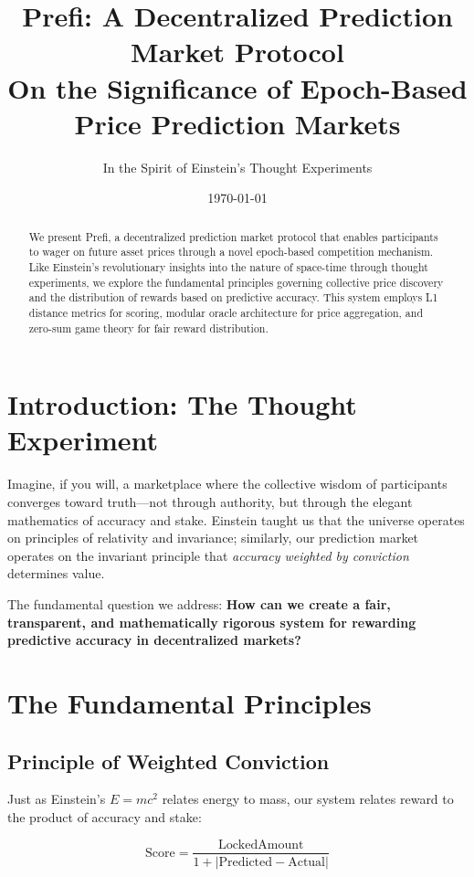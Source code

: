 \documentclass[12pt,a4paper]{article}
\title{\textbf{Prefi: A Decentralized Prediction Market Protocol}\\\large{On the Significance of Epoch-Based Price Prediction Markets}}
\author{In the Spirit of Einstein's Thought Experiments}
\date{\today}
\begin{document}
\maketitle

\begin{abstract}
We present Prefi, a decentralized prediction market protocol that enables participants to wager on future asset prices through a novel epoch-based competition mechanism. Like Einstein's revolutionary insights into the nature of space-time through thought experiments, we explore the fundamental principles governing collective price discovery and the distribution of rewards based on predictive accuracy. This system employs L1 distance metrics for scoring, modular oracle architecture for price aggregation, and zero-sum game theory for fair reward distribution.
\end{abstract}

\section{Introduction: The Thought Experiment}

Imagine, if you will, a marketplace where the collective wisdom of participants converges toward truth—not through authority, but through the elegant mathematics of accuracy and stake. Einstein taught us that the universe operates on principles of relativity and invariance; similarly, our prediction market operates on the invariant principle that \textit{accuracy weighted by conviction} determines value.

The fundamental question we address: \textbf{How can we create a fair, transparent, and mathematically rigorous system for rewarding predictive accuracy in decentralized markets?}

\section{The Fundamental Principles}

\subsection{Principle of Weighted Conviction}
Just as Einstein's $E=mc^2$ relates energy to mass, our system relates reward to the product of accuracy and stake:

\begin{equation}
\text{Score} = \frac{\text{LockedAmount}}{1 + |\text{Predicted} - \text{Actual}|}
\end{equation}
\end{document}
